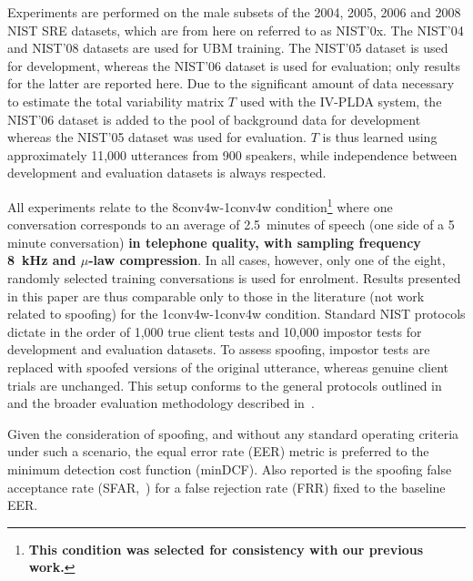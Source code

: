 
Experiments are performed on the male subsets of the 2004, 2005, 2006 and 2008 NIST SRE datasets, which are from here on referred to as NIST'0x.  
The NIST'04 and NIST'08 datasets are used for UBM training.
The NIST'05 dataset is used for development, whereas the NIST'06 dataset is used for evaluation;  
only results for the latter are reported here.
Due to the significant amount of data necessary to estimate the total variability matrix $T$ used with the IV-PLDA system, the NIST'06 dataset is added to the pool of background data for development whereas the NIST'05 dataset was used for evaluation. 
$T$ is thus learned using approximately 11,000 utterances from 900 speakers, while independence between development and evaluation datasets is always respected.
 
All experiments relate to the 8conv4w-1conv4w condition\footnote{\bfseries This condition was selected for consistency with our previous work.} where one conversation corresponds to an average of 2.5~minutes of speech (one side of a 5 minute conversation) {\bfseries in telephone quality, with sampling frequency 8~kHz and $\mu$-law compression}.  
In all cases, however, only one of the eight, randomly selected training conversations is used for enrolment.
Results presented in this paper are thus comparable only to those in the literature (not work related to spoofing) for the 1conv4w-1conv4w condition. 
Standard NIST protocols dictate in the order of 1,000 true client tests and 10,000 impostor tests for development and evaluation datasets. 
To assess spoofing, impostor tests are replaced with spoofed versions of the original utterance, whereas genuine client trials are unchanged.
This setup conforms to the general protocols outlined in~\cite{Wu2014a} and the broader evaluation methodology described in~\cite{Hadid2015}.

Given the consideration of spoofing, and without any standard operating criteria under such a scenario, the equal error rate (EER) metric is preferred to the minimum detection cost function (minDCF).  Also reported is the spoofing false acceptance rate (SFAR,~\cite{Johnson2010}) for a false rejection rate (FRR) fixed to the baseline EER.
